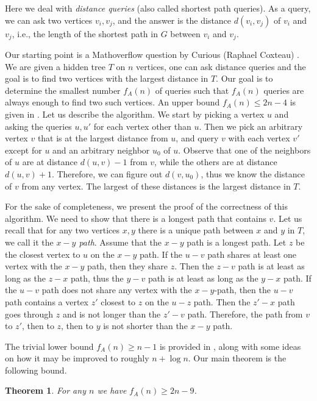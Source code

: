 \documentclass[12pt,a4paper]{amsart}
\theoremstyle{plain}
\newtheorem{theorem}{Theorem}[section]
\theoremstyle{definition}
\begin{document}
Here we deal with \textit{distance queries} (also called shortest path queries). As a query, we can ask two vertices $v_i,v_j$, and the answer is the distance $d(v_i,v_j)$ of $v_i$ and $v_j$, i.e., the length of the shortest path in $G$ between $v_i$ and $v_j$.

Our starting point is a Mathoverflow question by Curious (Raphael Coxteau) \cite{stack}. We are given a hidden tree $T$ on $n$ vertices, one can ask distance queries and the goal is to find two vertices with the largest distance in $T$. Our goal is to determine the smallest number $f_A(n)$ of queries such that $f_A(n)$ queries are always enough to find two such vertices. An upper bound $f_A(n)\le 2n-4$ is given in \cite{stack}. Let us describe the algorithm. We start by picking a vertex $u$ and asking the queries $u,u'$ for each vertex other than $u$. Then we pick an arbitrary vertex $v$ that is at the largest distance from $u$, and query $v$ with each vertex $v'$ except for $u$ and an arbitrary neighbor $u_0$ of $u$. Observe that one of the neighbors of $u$ are at distance $d(u,v)-1$ from $v$, while the others are at distance $d(u,v)+1$. Therefore, we can figure out $d(v,u_0)$, thus we know the distance of $v$ from any vertex. The largest of these distances is the largest distance in $T$.


For the sake of completeness, we present the proof of the correctness of this algorithm.
We need to show that there is a longest path that contains $v$. Let us recall that for any two vertices $x,y$ there is a unique path between $x$ and $y$ in $T$, we call it the \textit{$x-y$ path}. Assume that the $x-y$ path is a longest path. Let $z$ be the closest vertex to $u$ on the $x-y$ path. If the $u-v$ path shares at least one vertex with the $x-y$ path, then they share $z$. Then the $z-v$ path is at least as long as the $z-x$ path, thus the $y-v$ path is at least as long as the $y-x$ path. If the $u-v$ path does not share any vertex with the $x-y$-path, then the $u-v$ path contains a vertex $z'$ closest to $z$ on the $u-z$ path. Then the $z'-x$ path goes through $z$ and is not longer than the $z'-v$ path. Therefore, the
path from $v$ to $z'$, then to $z$, then to $y$ is not shorter than the $x-y$ path.




The trivial lower bound $f_A(n)\ge n-1$ is provided in \cite{stack}, along with some ideas on how it may be improved to roughly $n+\log n$. Our main theorem is the following bound.

\begin{theorem}\label{main}
    For any $n$ we have $f_A(n)\ge 2n-9$.
\end{theorem}
\end{document}
